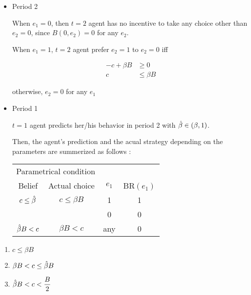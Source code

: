 \documentclass{jsarticle}
\begin{document}
\begin{enumerate}
\begin{enumerate}
 \begin{itemize}
 
 \item Period 2
 
 When $e_1=0$, then $t=2$ agent has no incentive to take any choice other than $e_2=0$, since $B(0,e_2)=0$ for any $e_2$.
 
 When $e_1=1$, $t=2$ agent prefer $e_2=1$ to $e_2=0$ iff
 
 \begin{align*}
 - c + \beta B &\geq 0 \\
 c & \leq \beta B
 \end{align*}
 
 otherwise, $e_2=0$ for any $e_1$
 
 \item Period 1
 
 $t=1$ agent predicts her/his behavior in period 2 with $\Hat{\beta} \in (\beta, 1)$.
 
 Then, the agent's prediction and the acual strategy depending on the parameters are summerized as follows :
 
  \begin{center}
  
  \begin{tabular}{cccc} \hline
 \multicolumn{2}{c}{Parametrical condition} & & \\
 \multicolumn{1}{c}{Belief} & \multicolumn{1}{c}{Actual choice} & $e_1$ & BR$(e_1)$ \\ \hline
 $c \leq \Hat{\beta}$ & $c \leq \beta B$ & 1 & 1 \\
  & & 0 & 0 \\
 $\Hat{\beta} B < c $ & $\beta B <c$ & any & 0 \\ \hline
  \end{tabular}
  
  \end{center}
  
  \vspace{1zw}
 
 \end{itemize}

 \begin{enumerate}
 
 \item $c \leq \beta B$
 
 
 
 \item $\beta B < c \leq \Hat{\beta} B$
 
 
 
 \item $\Hat{\beta} B < c < \dfrac{B}{2}$
 
 
 
 \end{enumerate}

\end{enumerate}

\end{enumerate}
\end{document}
